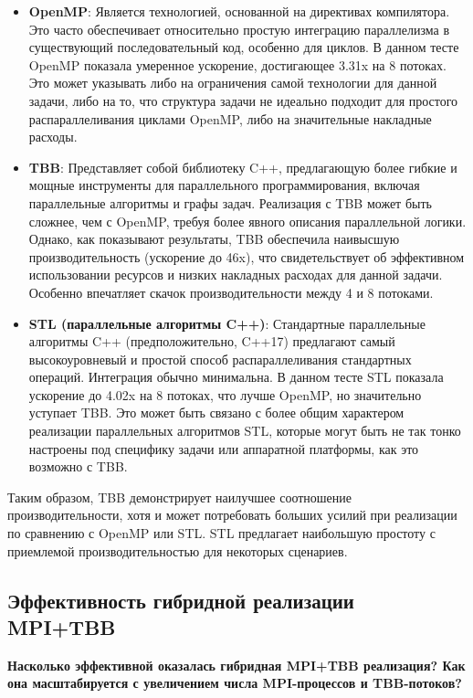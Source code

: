 \documentclass[a4paper,12pt]{article}
\begin{document}
\begin{itemize}
    \item \textbf{OpenMP}: Является технологией, основанной на директивах компилятора. Это часто обеспечивает относительно простую интеграцию параллелизма в существующий последовательный код, особенно для циклов. В данном тесте OpenMP показала умеренное ускорение, достигающее 3.31x на 8 потоках. Это может указывать либо на ограничения самой технологии для данной задачи, либо на то, что структура задачи не идеально подходит для простого распараллеливания циклами OpenMP, либо на значительные накладные расходы.
    \item \textbf{TBB}: Представляет собой библиотеку C++, предлагающую более гибкие и мощные инструменты для параллельного программирования, включая параллельные алгоритмы и графы задач. Реализация с TBB может быть сложнее, чем с OpenMP, требуя более явного описания параллельной логики. Однако, как показывают результаты, TBB обеспечила наивысшую производительность (ускорение до 46x), что свидетельствует об эффективном использовании ресурсов и низких накладных расходах для данной задачи. Особенно впечатляет скачок производительности между 4 и 8 потоками.
    \item \textbf{STL (параллельные алгоритмы C++)}: Стандартные параллельные алгоритмы C++ (предположительно, C++17) предлагают самый высокоуровневый и простой способ распараллеливания стандартных операций. Интеграция обычно минимальна. В данном тесте STL показала ускорение до 4.02x на 8 потоках, что лучше OpenMP, но значительно уступает TBB. Это может быть связано с более общим характером реализации параллельных алгоритмов STL, которые могут быть не так тонко настроены под специфику задачи или аппаратной платформы, как это возможно с TBB.
\end{itemize}
Таким образом, TBB демонстрирует наилучшее соотношение производительности, хотя и может потребовать больших усилий при реализации по сравнению с OpenMP или STL. STL предлагает наибольшую простоту с приемлемой производительностью для некоторых сценариев.

\subsection*{Эффективность гибридной реализации MPI+TBB}

\textbf{Насколько эффективной оказалась гибридная MPI+TBB реализация? Как она масштабируется с увеличением числа MPI-процессов и TBB-потоков?}
\end{document}
